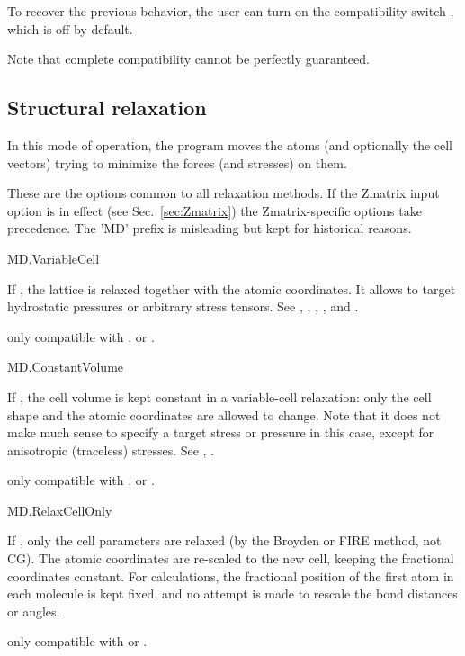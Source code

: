 To recover the previous behavior, the user can turn on the
compatibility switch , which is off by
default.

Note that complete compatibility cannot be perfectly guaranteed.

\subsection{Structural relaxation}

In this mode of operation, the program moves the atoms (and optionally
the cell vectors) trying to minimize the forces (and stresses) on
them.

These are the options common to all relaxation methods. If the Zmatrix
input option is in effect (see Sec.~\ref{sec:Zmatrix}) the
Zmatrix-specific options take precedence.  The 'MD' prefix is
misleading but kept for historical reasons.

\begin{fdflogicalF}{MD.VariableCell}

  If \fdftrue, the lattice is relaxed together with the atomic
  coordinates. It allows to target hydrostatic pressures or arbitrary
  stress tensors. See ,
  , ,
  , and
  .

  \note only compatible with ,
   or .

\end{fdflogicalF}


\begin{fdflogicalF}{MD.ConstantVolume}

  If \fdftrue, the cell volume is kept constant in a variable-cell
  relaxation: only the cell shape and the atomic coordinates are
  allowed to change.  Note that it does not make much sense to specify
  a target stress or pressure in this case, except for anisotropic
  (traceless) stresses.  See ,
  .

  \note only compatible with ,
   or .

\end{fdflogicalF}

\begin{fdflogicalF}{MD.RelaxCellOnly}

  If \fdftrue, only the cell parameters are relaxed (by the Broyden or
  FIRE method, not CG). The atomic coordinates are re-scaled to the
  new cell, keeping the fractional coordinates constant. For
   calculations, the fractional position of the first
  atom in each molecule is kept fixed, and no attempt is made to
  rescale the bond distances or angles.

  \note only compatible with  or .

\end{fdflogicalF}

